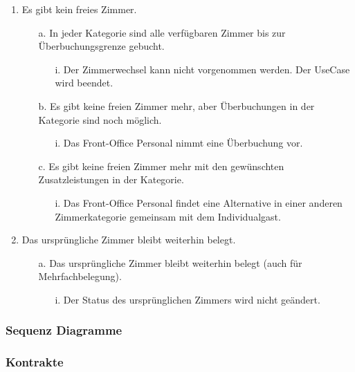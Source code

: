 \documentclass[./detailed_overview_usecases.tex]{subfiles}
\begin{document}
\begin{enumerate}
\begin{itemize}
\begin{itemize}
                \end{itemize}
        \end{itemize}
        \setcounter{enumi}{4}
        \item Es gibt kein freies Zimmer.
            \begin{itemize}
                \item[a.] In jeder Kategorie sind alle verfügbaren Zimmer bis zur Überbuchungsgrenze gebucht.
                    \begin{itemize}
                        \item[i.] Der Zimmerwechsel kann nicht vorgenommen werden. Der UseCase wird beendet.
                    \end{itemize}
                \item[b.] Es gibt keine freien Zimmer mehr, aber Überbuchungen in der Kategorie sind noch möglich.
                    \begin{itemize}
                        \item[i.] Das Front-Office Personal nimmt eine Überbuchung vor.
                     \end{itemize}
                \item[c.] Es gibt keine freien Zimmer mehr mit den gewünschten Zusatzleistungen in der Kategorie.
                        \begin{itemize}
                            \item[i.] Das Front-Office Personal findet eine Alternative in einer anderen Zimmerkategorie gemeinsam mit dem Individualgast.
                        \end{itemize}
            \end{itemize}
        \setcounter{enumi}{6}
        \item Das ursprüngliche Zimmer bleibt weiterhin belegt.
            \begin{itemize}
                \item[a.] Das ursprüngliche Zimmer bleibt weiterhin belegt (auch für Mehrfachbelegung).
                    \begin{itemize}
                        \item[i.] Der Status des ursprünglichen Zimmers wird nicht geändert.
                    \end{itemize}
            \end{itemize}
    \end{enumerate}

    \subsubsection{Sequenz Diagramme}
    \subsubsection{Kontrakte}
\end{document}

